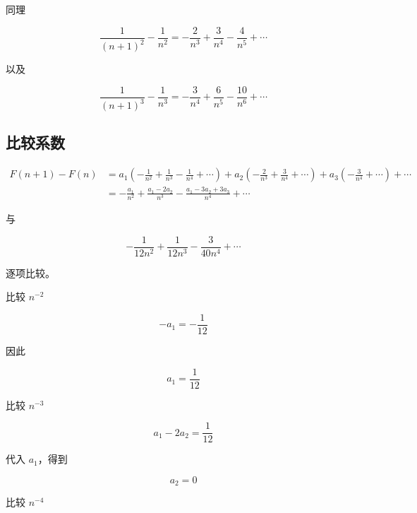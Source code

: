 \documentclass[11pt]{article}%
\begin{document}
    \vspace{1em}
    同理

    \[
    \boxed{
    \frac1{(n+1)^2}-\frac1{n^2}
    =
    -\frac2{n^3}
    +\frac3{n^4}
    -\frac4{n^5}
    +\cdots
    }
    \]

    \vspace{1em}
    以及

    \[
    \boxed{
    \frac1{(n+1)^3}-\frac1{n^3}
    =
    -\frac3{n^4}
    +\frac6{n^5}
    -\frac{10}{n^6}
    +\cdots
    }
    \]

    \subsection{比较系数}

    \[
    \begin{aligned}
    F(n+1)-F(n)
    &=
    a_1
    \left(
    -\frac1{n^2}
    +\frac1{n^3}
    -\frac1{n^4}
    +\cdots
    \right)
    +
    a_2
    \left(
    -\frac2{n^3}
    +\frac3{n^4}
    +\cdots
    \right)
    +
    a_3
    \left(
    -\frac3{n^4}
    +\cdots
    \right)
    +\cdots \\
    &=
    -\frac{a_1}{n^2}
    +\frac{a_1-2a_2}{n^3}
    -\frac{a_1-3a_2+3a_3}{n^4}
    +\cdots
    \end{aligned}
    \]

    \vspace{1em}
    与

    \[
    -\frac1{12n^2}
    +\frac1{12n^3}
    -\frac3{40n^4}
    +\cdots
    \]

    \vspace{1em}
    逐项比较。

    比较 \(n^{-2}\)

    \[
    -a_1
    =
    -\frac1{12}
    \]

    \vspace{1em}
    因此

    \[
    \boxed{
    a_1=\frac1{12}
    }
    \]

    \vspace{1em}
    比较 \(n^{-3}\)

    \[
    a_1-2a_2
    =
    \frac1{12}
    \]

    \vspace{1em}
    代入 \(a_1\)，得到

    \[
    \boxed{
    a_2=0
    }
    \]

    \vspace{1em}
    比较 \(n^{-4}\)
\end{document}
